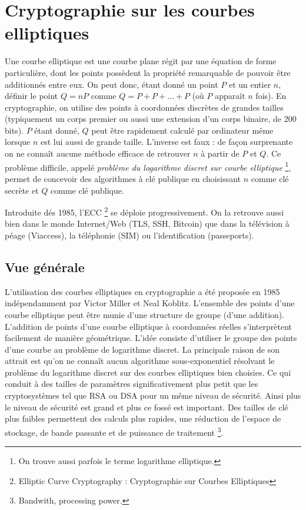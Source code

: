\chapter{Cryptographie sur les courbes elliptiques}
Une courbe elliptique est une courbe plane régit par une équation de forme particulière, dont les points possèdent la propriété remarquable de pouvoir être additionnés entre eux. On peut donc, étant donné un point $P$ et un entier $n$, définir le point $Q = nP$ comme $Q = P + P + \ldots + P$ (où $P$ apparaît $n$ fois). En cryptographie, on utilise des points à coordonnées discrètes de grandes tailles (typiquement un corps premier ou aussi une extension d'un corps binaire, de 200 bits). $P$ étant donné, $Q$ peut être rapidement calculé par ordinateur même lorsque $n$ est lui aussi de grande taille. L'inverse est faux : de façon surprenante on ne connaît aucune méthode efficace de retrouver $n$ à partir de $P$ et $Q$. Ce problème difficile, appelé \emph{problème du logarithme discret sur courbe elliptique} \footnote{On trouve aussi parfois le terme logarithme elliptique.}, permet de concevoir des algorithmes à clé publique en choisissant $n$ comme clé secrète et $Q$ comme clé publique.

Introduite dés 1985, l'ECC \footnote{Elliptic Curve Cryptography : Cryptographie sur Courbes Elliptiques} se déploie progressivement. On la retrouve aussi bien dans le monde Internet/Web (TLS, SSH, Bitcoin) que dans la télévision à péage (Viaccess), la téléphonie (SIM) ou l'identification (passeports).


\section{Vue générale}
L'utilisation des courbes elliptiques en cryptographie a été proposée en 1985 indépendamment par Victor Miller et Neal Koblitz. L'ensemble des points d'une courbe elliptique peut être munie d'une structure de groupe (d'une addition). L'addition de points d'une courbe elliptique à coordonnées réelles s'interprètent facilement de manière géométrique. L'idée consiste d'utiliser le groupe des points d'une courbe au problème de logarithme discret. La principale raison de son attrait est qu'on ne connaît aucun algorithme sous-exponentiel résolvant le problème du logarithme discret sur des courbes elliptiques bien choisies. Ce qui conduit à des tailles de paramètres significativement plus petit que les cryptosystèmes tel que RSA ou DSA pour un même niveau de sécurité. Ainsi plus le niveau de sécurité est grand et plus ce fossé est important. Des tailles de clé plus faibles permettent des calculs plus rapides, une réduction de l'espace de stockage, de bande passante et de puissance de traitement \footnote{Bandwith, processing power.}.

